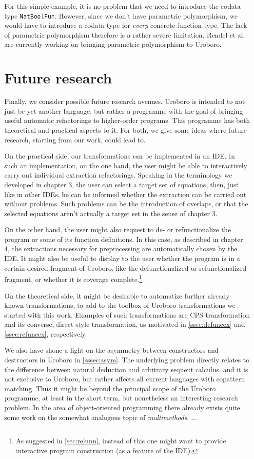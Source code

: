 For this simple example, it is no problem that we need to introduce the codata type \texttt{NatBoolFun}. However, since we don't have parametric polymorphism, we would have to introduce a codata type for \textit{every} concrete function type. The lack of parametric polymorphism therefore is a rather severe limitation. Rendel et al. are currently working on bringing parametric polymorphism to Uroboro.

\section{Future research}
\label{sec:futr}

Finally, we consider possible future research avenues. Uroboro is intended to not just be yet another language, but rather a programme with the goal of bringing useful automatic refactorings to higher-order programs. This programme has both theoretical and practical aspects to it. For both, we give some ideas where future research, starting from our work, could lead to.

On the practical side, our transformations can be implemented in an IDE. In such an implementation, on the one hand, the user might be able to interactively carry out individual extraction refactorings. Speaking in the terminology we developed in chapter 3, the user can select a target set of equations, then, just like in other IDEs, he can be informed whether the extraction can be carried out without problems. Such problems can be the introduction of overlaps, or that the selected equations aren't actually a target set in the sense of chapter 3.

On the other hand, the user might also request to de- or refunctionalize the program or some of its function definitions. In this case, as described in chapter 4, the extractions necessary for preprocessing are automatically chosen by the IDE. It might also be useful to display to the user whether the program is in a certain desired fragment of Uroboro, like the defunctionalized or refunctionalized fragment, or whether it is coverage complete.\footnote{As suggested in \autoref{sec:relunn}, instead of this one might want to provide interactive program construction (as a feature of the IDE).}

On the theoretical side, it might be desirable to automatize further already known transformations, to add to the toolbox of Uroboro transformations we started with this work. Examples of such transformations are CPS transformation and its converse, direct style transformation, as motivated in \autoref{ssec:defuncex} and \autoref{ssec:refuncex}, respectively.

We also have shone a light on the asymmetry between constructors and destructors in Uroboro in \autoref{sssec:asym}. The underlying problem directly relates to the difference between natural deduction and arbitrary sequent calculus, and it is not exclusive to Uroboro, but rather affects all current languages with copattern matching. Thus it might be beyond the principal scope of the Uroboro programme, at least in the short term, but nonetheless an interesting research problem. In the area of object-oriented programming there already exists quite some work on the somewhat analogous topic of \textit{multimethods}. ...